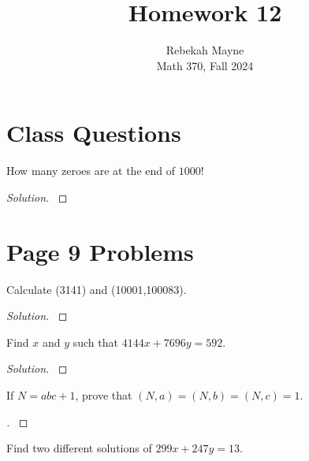 \documentclass[11pt]{article}
\newenvironment{myproof}[1][\proofname]{%
  \begin{proof}[#1]$ $\par\nobreak\ignorespaces
}{%
  \end{proof}
}
\newenvironment{problem}[2][Problem]{\begin{trivlist}
\item[\hskip \labelsep {\bfseries #1}\hskip \labelsep {\bfseries #2.}]}{\end{trivlist}}
\newenvironment{solution}
  {\renewcommand\qedsymbol{$~$}\begin{proof}[Solution]$ $\par\nobreak\ignorespaces}
  {\end{proof}}
\begin{document}
 
\title{Homework 12}
\author{Rebekah Mayne\\
Math 370, Fall 2024}
\maketitle


 \section{Class Questions}
 
\begin{problem}{1}
How many zeroes are at the end of $1000!$ 
\end{problem}

\begin{solution}

\end{solution}



\section{Page 9 Problems}

\begin{problem}{2} 
Calculate (3141) and (10001,100083).
\end{problem}

\begin{solution}

\end{solution}


\begin{problem}{4} 
Find $x$ and $y$ such that $4144x+7696y=592$.
\end{problem}

\begin{solution}

\end{solution}



\begin{problem}{5} 
If $N=abc+1$, prove that $(N,a)=(N,b)=(N,c)=1$.
\end{problem}

\begin{myproof}

\end{myproof}


\begin{problem}{6} 
Find two different solutions of $299x+247y=13$.
\end{problem}
\end{document}
